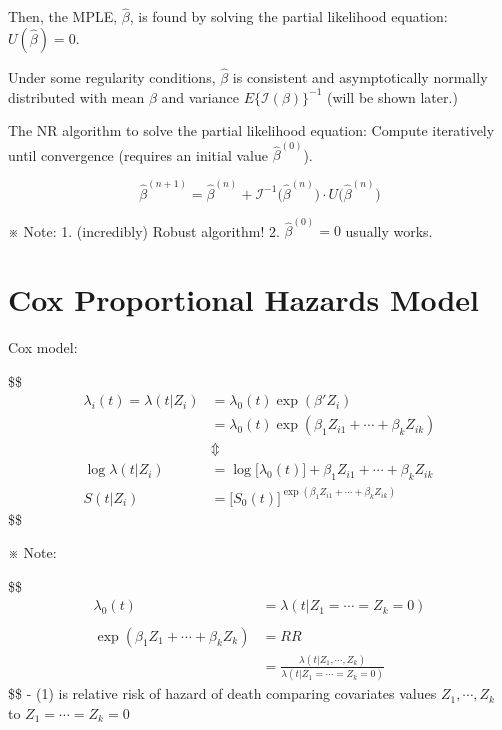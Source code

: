 \documentclass[
]{book}
\theoremstyle{definition}
\theoremstyle{definition}
\theoremstyle{definition}
\theoremstyle{definition}
\theoremstyle{remark}
\begin{document}
Then, the MPLE, \(\hat \beta\), is found by solving the partial likelihood equation: \(U(\hat \beta) = 0\).

Under some regularity conditions, \(\hat \beta\) is consistent and asymptotically normally distributed with mean \(\beta\) and variance \(E \Big \{ \mathcal I(\beta) \Big\}^{-1}\) (will be shown later.)

The NR algorithm to solve the partial likelihood equation: Compute iteratively until convergence (requires an initial value \(\hat \beta^{(0)}\)).

\[
\hat\beta^{(n+1)} = \hat\beta^{(n)} + \mathcal I ^{-1} \Big( \hat \beta^{(n)}\Big) \cdot U \Big( \hat \beta^{(n)}\Big)
\]

※ Note:
1. (incredibly) Robust algorithm!
2. \(\hat \beta^{(0)} = 0\) usually works.

\hypertarget{cox-proportional-hazards-model}{%
\section{Cox Proportional Hazards Model}\label{cox-proportional-hazards-model}}

Cox model:

\$\$
\begin{align}

\lambda_i(t) = \lambda(t \Big | Z_i ) 
&= \lambda_0 (t) \exp(\beta ' Z_i) 
\\
&= \lambda_0(t) \exp(\beta_1 Z_{i1} + \cdots + \beta_k Z_{ik})
\\
&\Updownarrow
\\

\log \lambda(t \Big | Z_i ) &= \log \Big[ \lambda_0(t) \Big] +\beta_1 Z_{i1} + \cdots + \beta_k Z_{ik}
\\
S(t \Big | Z_i ) &= 



\Big[ S_0(t) \Big]^{\exp(\beta_1 Z_{i1} + \cdots + \beta_k Z_{ik})}


\end{align}
\$\$

※ Note:

\$\$
\begin{align}
\lambda_0 (t) &= \lambda(t \Big | Z_1 = \cdots = Z_k = 0)
\\
\\
\exp(\beta_1 Z_{1} + \cdots + \beta_k Z_{k}) &= RR 



\\
&= \frac{\lambda(t \Big | Z_1 , \cdots, Z_k)}{\lambda(t \Big | Z_1 = \cdots = Z_k = 0)} \tag{1}
\end{align}
\$\$
- (1) is relative risk of hazard of death comparing covariates values \(Z_1,\cdots, Z_k\) to \(Z_1 = \cdots = Z_k = 0\)
\end{document}

